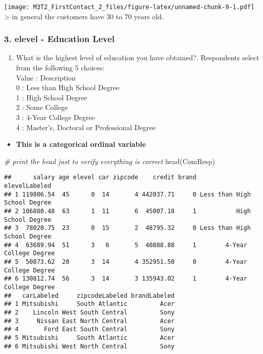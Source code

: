 \documentclass[
]{article}
\newenvironment{Shaded}{\begin{snugshade}}{\end{snugshade}}
\newcommand{\CommentTok}[1]{\textcolor[rgb]{0.56,0.35,0.01}{\textit{#1}}}
\newcommand{\FunctionTok}[1]{\textcolor[rgb]{0.00,0.00,0.00}{#1}}
\newcommand{\NormalTok}[1]{#1}
\providecommand{\tightlist}{%
  \setlength{\itemsep}{0pt}\setlength{\parskip}{0pt}}
\begin{document}
\texttt{[image: M3T2\_FirstContact\_2\_files/figure-latex/unnamed-chunk-9-1.pdf]}
\textgreater{} in general the customers have 30 to 70 years old.

\hypertarget{elevel---education-level}{%
\subsubsection{3. elevel - Education
Level}\label{elevel---education-level}}

\begin{enumerate}
\def\labelenumi{\arabic{enumi})}
\setcounter{enumi}{2}
\tightlist
\item
  What is the highest level of education you have obtained?. Respondents
  select from the following 5 choices:\\
  Value : Description\\
  0 : Less than High School Degree\\
  1 : High School Degree\\
  2 : Some College\\
  3 : 4-Year College Degree\\
  4 : Master's, Doctoral or Professional Degree
\end{enumerate}

\begin{itemize}
\tightlist
\item
  \textbf{This is a categorical ordinal variable}
\end{itemize}

\begin{Shaded}
\begin{Highlighting}[]
\CommentTok{\# print the head just to verify everything is correct}
\FunctionTok{head}\NormalTok{(ComResp)}
\end{Highlighting}
\end{Shaded}

\begin{verbatim}
##      salary age elevel car zipcode    credit brand                elevelLabeled
## 1 119806.54  45      0  14       4 442037.71     0 Less than High School Degree
## 2 106880.48  63      1  11       6  45007.18     1           High School Degree
## 3  78020.75  23      0  15       2  48795.32     0 Less than High School Degree
## 4  63689.94  51      3   6       5  40888.88     1        4-Year College Degree
## 5  50873.62  20      3  14       4 352951.50     0        4-Year College Degree
## 6 130812.74  56      3  14       3 135943.02     1        4-Year College Degree
##   carLabeled     zipcodeLabeled brandLabeled
## 1 Mitsubishi     South Atlantic         Acer
## 2    Lincoln West South Central         Sony
## 3     Nissan East North Central         Acer
## 4       Ford East South Central         Sony
## 5 Mitsubishi     South Atlantic         Acer
## 6 Mitsubishi West North Central         Sony
\end{verbatim}
\end{document}
